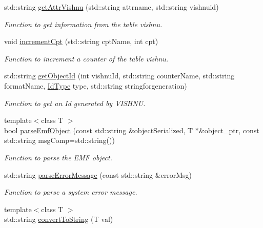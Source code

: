\begin{DoxyCompactItemize}
std::string \hyperlink{namespacevishnu_a0adf01cdd878372e5fb44b3f1d9d86be}{getAttrVishnu} (std::string attrname, std::string vishnuid)
\begin{DoxyCompactList}\small\item\em Function to get information from the table vishnu. \item\end{DoxyCompactList}\item 
void \hyperlink{namespacevishnu_a999d6bcb9346a8b398d5c94eb01a125a}{incrementCpt} (std::string cptName, int cpt)
\begin{DoxyCompactList}\small\item\em Function to increment a counter of the table vishnu. \item\end{DoxyCompactList}\item 
std::string \hyperlink{namespacevishnu_a9349617bc14f92c6dfe67745dcbac8ff}{getObjectId} (int vishnuId, std::string counterName, std::string formatName, \hyperlink{namespacevishnu_aff8a694c2bc2b55465a31b4bf00f58c1}{IdType} type, std::string stringforgeneration)
\begin{DoxyCompactList}\small\item\em Function to get an Id generated by VISHNU. \item\end{DoxyCompactList}\item 
{\footnotesize template$<$class T $>$ }\\bool \hyperlink{namespacevishnu_a864d60dc9a2f4fe9048e522718698e84}{parseEmfObject} (const std::string \&objectSerialized, T $\ast$\&object\_\-ptr, const std::string msgComp=std::string())
\begin{DoxyCompactList}\small\item\em Function to parse the EMF object. \item\end{DoxyCompactList}\item 
std::string \hyperlink{namespacevishnu_aaf3976b9b53965c46bc9bcf847ba286f}{parseErrorMessage} (const std::string \&errorMsg)
\begin{DoxyCompactList}\small\item\em Function to parse a system error message. \item\end{DoxyCompactList}\item 
{\footnotesize template$<$class T $>$ }\\std::string \hyperlink{namespacevishnu_add18720aacc1db6052abecedd5d6feaa}{convertToString} (T val)

\end{DoxyCompactItemize}
